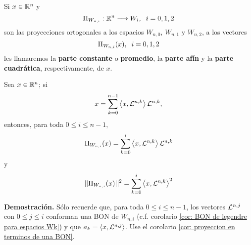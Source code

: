 \begin{defi}
Si $x \in \mathbb{R}^{n}$ y
\begin{equation}
\label{eq0: 5Dic}
\Pi_{W_{n,i}}: \mathbb{R} ^{n}  \longrightarrow W_{i}, \hspace{0.2cm}
i=0,1,2
\end{equation}
son las proyecciones ortogonales
a los espacios 
$W_{n,0}$, $W_{n,1}$ y $W_{n,2}$, a los vectores
\[
\Pi_{W_{n,i}}(x), \hspace{0.2cm} i=0,1,2
\]
les llamaremos la \textbf{parte constante}
o \textbf{promedio}, la \textbf{parte afín} y la
\textbf{parte cuadrática}, respectivamente, de $x$.
\end{defi}

\begin{prop}
\label{prop: proyecciones a espacios Wn,k}
Sea $x \in \mathbb{R}^{n}$; si
\[
x= \sum\limits_{k=0}^{n-1}\left\langle x, \mathcal{L}^{n,k} \right\rangle\mathcal{L}^{n,k},
\]
entonces, para toda $0 \leq i \leq n-1$,
\[
\Pi_{W_{n,i}}(x)=\sum\limits_{k=0}^{i}\left\langle x, \mathcal{L}^{n,k} \right\rangle\mathcal{L}^{n,k}
\]
y
\[
||\Pi_{W_{n,i}}(x)||^{2}=\sum\limits_{k=0}^{i}\left\langle x, \mathcal{L}^{n,k} \right\rangle^{2}
\]
\end{prop}
\textbf{Demostración.}
Sólo recuerde que, para toda $0 \leq i \leq n-1$,
los vectores $\mathcal{L}^{n, j}$ con $0 \leq j \leq i$
conforman una BON de $W_{n,i}$
(c.f. corolario \ref{cor: BON de legendre para espacios Wk}) y
que $a_{k}= \langle x, \mathcal{L}^{n,j} \rangle$.
Use el corolario \ref{cor: proyeccion en terminos de una BON}.
\QEDB 
\vspace{0.2cm}

